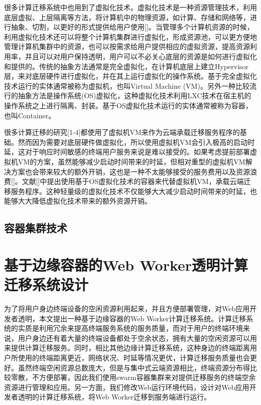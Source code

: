 很多计算迁移系统中也用到了虚拟化技术。虚拟化技术是一种资源管理技术，利用底层虚拟、上层隔离等方法，将计算机中的物理资源，如计算、存储和网络等，进行抽象、切割，以更好的形式提供给用户使用[]。当管理多个计算机资源的时候，利用虚拟化技术还可以将整个计算机集群进行虚拟化，形成资源池，可以更方便地管理计算机集群中的资源，也可以按需求给用户提供相应的虚拟资源，提高资源利用率，并且可以对用户保持透明，用户可以不必关心底层的资源是如何进行虚拟化和提供的。传统的抽象方法通常是完全虚拟化，在计算机底层上建立Hypervisor层，来对底层硬件进行虚拟化，并在其上运行虚拟化的操作系统。基于完全虚拟化技术运行的实体通常被称为虚拟机，也叫Virtual Machine (VM)。另外一种比较流行的抽象方法是操作系统(OS)虚拟化，这种虚拟化技术利用LXC技术在宿主机的操作系统之上进行隔离、封装。基于OS虚拟化技术运行的实体通常被称为容器，也叫Container。

很多计算迁移的研究[1-4]都使用了虚拟机VM来作为云端承载迁移服务程序的基础。然而因为需要对底层硬件做虚拟化，所以使用虚拟机VM会引入极高的启动时延，这对于响应时间敏感的终端用户服务来说是难以接受的。如果考虑提前部署虚拟机VM的方案，虽然能够减少启动时间带来的时延，但相对重型的虚拟机VM解决方案也会带来较大的额外开销，这也是一种不太能够接受的服务费用以及资源浪费[]。文献[]中提出使用基于OS虚拟化技术的容器来代替虚拟机VM，承载云端迁移服务程序。这种轻量级的虚拟化技术不仅能够大大减少启动时间带来的时延，也能够大大降低虚拟化技术带来的额外资源开销。

\subsection{容器集群技术}
\section{基于边缘容器的Web Worker透明计算迁移系统设计}

为了将用户身边终端设备的空闲资源利用起来，并且方便部署管理，对Web应用开发者透明，本文提出一种基于边缘容器的Web Worker计算迁移系统。计算迁移系统的实质是利用冗余来提高终端服务系统的服务质量，而对于用户的终端环境来说，用户身边还有着大量的终端设备都处于空余状态，拥有大量的空闲资源可以用来提供计算迁移服务。同时，相比其他边缘计算迁移系统，这种身边的终端距离用户所使用的终端距离更近，网络状况、时延等情况更优，计算迁移服务质量也会更好。虽然终端空闲资源总数庞大，但是与集中式云端资源相比，终端资源分布得比较零散，不方便部署，因此我们使用swarm容器集群来对提供迁移服务的终端空余资源进行管理和应用。另一方面，我们修改Web运行环境代码，设计对Web应用开发者透明的计算迁移系统，将Web Worker迁移到服务端进行运行。
